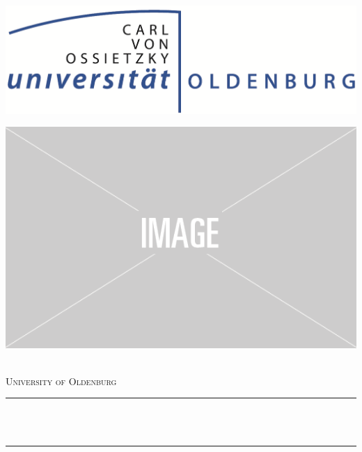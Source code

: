 
\begin{titlepage}
	\centering
    \vspace*{0.5 cm}
    
    \begin{minipage}[c]{.45\textwidth}
    \includegraphics[scale=1.1]{Pictures/logo.png}	%
    \end{minipage}\hfill
    \begin{minipage}[c]{.45\textwidth}
    \includegraphics[scale=0.2]{Pictures/placeholder.png}
    \end{minipage}
    \\[1.0cm]
    \textsc{\LARGE University of Oldenburg}\\[1.0 cm]	%
	\rule{\linewidth}{0.2 mm} \\[0.4 cm]
	{ \Large \bfseries \thetitle}\\
	\rule{\linewidth}{0.2 mm} \\[1.5 cm]
	

\end{titlepage}

